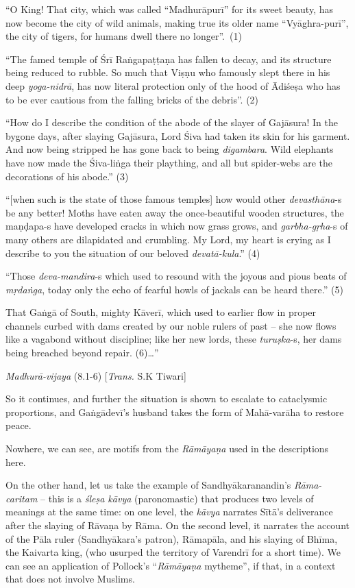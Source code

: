 \begin{myquote}
“O King! That city, which was called “Madhurāpurī” for its sweet beauty, has now become the city of wild animals, making true its older name “Vyāghra-purī”, the city of tigers, for humans dwell there no longer”.~(1) 

“The famed temple of Śrī Raṅgapaṭṭaṇa has fallen to decay, and its structure being reduced to rubble. So much that Viṣṇu who famously slept there in his deep {\sl yoga-nidrā}, has now literal protection only of the hood of Ādiśeṣa who has to be ever cautious from the falling bricks of the debris”. (2) 

“How do I describe the condition of the abode of the slayer of Gajāsura! In the bygone days, after slaying Gajāsura, Lord Śiva had taken its skin for his garment. And now being stripped he has gone back to being {\sl digambara}. Wild elephants have now made the Śiva-liṅga their plaything, and all but spider-webs are the decorations of his abode.” (3) 

“[when such is the state of those famous temples] how would other {\sl devasthāna}-s be any better! Moths have eaten away the once-beautiful wooden structures, the maṇḍapa-s have developed cracks in which now grass grows, and {\sl garbha-gṛha}-s of many others are dilapidated and crumbling. My Lord, my heart is crying as I describe to you the situation of our beloved {\sl devatā-kula}.” (4) 

“Those {\sl deva-mandira}-s which used to resound with the joyous and pious beats of {\sl mṛdaṅga}, today only the echo of fearful howls of jackals can be heard there.” (5) 

That Gaṅgā of South, mighty Kāverī, which used to earlier flow in proper channels curbed with dams created by our noble rulers of past – she now flows like a vagabond without discipline; like her new lords, these {\sl turuṣka}-s, her dams being breached beyond repair. (6)…” 

\hfill {\sl Madhurā-vijaya} (8.1-6) [{\sl Trans.} S.K  Tiwari]
\end{myquote}

So it continues, and further the situation is shown to escalate to cataclysmic proportions, and Gaṅgādevī’s husband takes the form of Mahā-varāha to restore peace. 

Nowhere, we can see, are motifs from the {\sl Rāmāyaṇa} used in the descriptions here.  

On the other hand, let us take the example of Sandhyākaranandin's {\sl Rāma-caritam} – this is a {\sl śleṣa kāvya} (paronomastic) that produces two levels of meanings at the same time: on one level, the {\sl kāvya} narrates Sītā’s deliverance after the slaying of Rāvaṇa by Rāma.  On the second level, it narrates the account of the Pāla ruler (Sandhyākara’s patron), Rāmapāla, and his slaying of Bhīma, the Kaivarta king, (who usurped the territory of Varendrī for a short time). We can see an application of Pollock’s “{\sl Rāmāyaṇa} mytheme”, if that, in a context that does not involve Muslims. 

